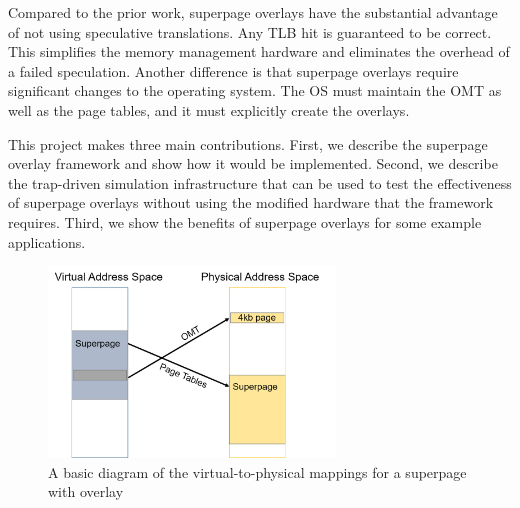Compared to the prior work, superpage overlays have the substantial advantage of not using speculative translations. Any TLB hit is guaranteed to be correct. This simplifies the memory management hardware and eliminates the overhead of a failed speculation. Another difference is that superpage overlays require significant changes to the operating system. The OS must maintain the OMT as well as the page tables, and it must explicitly create the overlays.

This project makes three main contributions. First, we describe the superpage overlay framework and show how it would be implemented. Second, we describe the trap-driven simulation infrastructure that can be used to test the effectiveness of superpage overlays without using the modified hardware that the framework requires. Third, we show the benefits of superpage overlays for some example applications.

\begin{figure}
    \centering
    \includegraphics[width=3in]{Figures/Picture1}
    \caption{A basic diagram of the virtual-to-physical mappings for a superpage with overlay}
    \label{fig:basic}
\end{figure}
